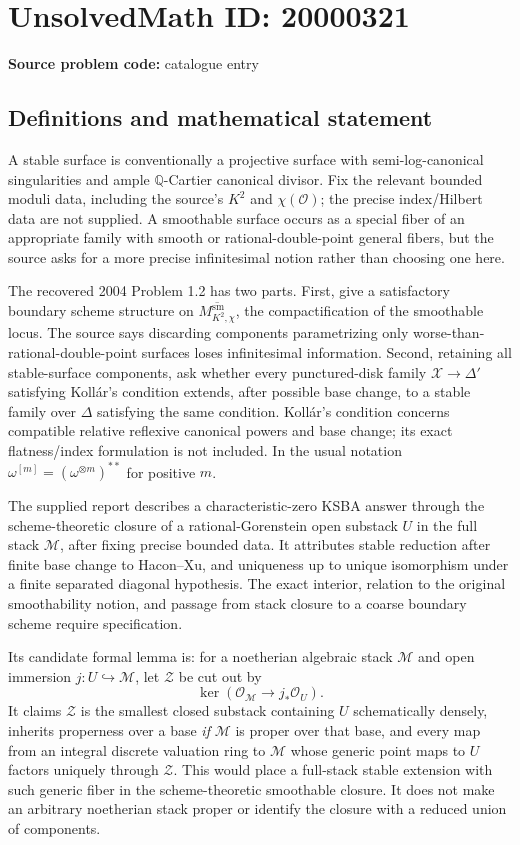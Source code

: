 \documentclass[11pt]{article}
\newcommand{\Q}{\mathbb{Q}}
\begin{document}
\section*{UnsolvedMath ID: 20000321}
\textbf{Source problem code:} catalogue entry
\subsection{Definitions and mathematical statement}
A stable surface is conventionally a projective surface with semi-log-canonical singularities and ample $\Q$-Cartier canonical divisor. Fix the relevant bounded moduli data, including the source's $K^2$ and $\chi(\mathcal O)$; the precise index/Hilbert data are not supplied. A smoothable surface occurs as a special fiber of an appropriate family with smooth or rational-double-point general fibers, but the source asks for a more precise infinitesimal notion rather than choosing one here.

The recovered 2004 Problem 1.2 has two parts. First, give a satisfactory boundary scheme structure on $\overline{M^{\mathrm{sm}}_{K^2,\chi}}$, the compactification of the smoothable locus. The source says discarding components parametrizing only worse-than-rational-double-point surfaces loses infinitesimal information. Second, retaining all stable-surface components, ask whether every punctured-disk family $\mathcal X\to\Delta'$ satisfying Koll\'ar's condition extends, after possible base change, to a stable family over $\Delta$ satisfying the same condition. Koll\'ar's condition concerns compatible relative reflexive canonical powers and base change; its exact flatness/index formulation is not included. In the usual notation $\omega^{[m]}=(\omega^{\otimes m})^{**}$ for positive $m$.

The supplied report describes a characteristic-zero KSBA answer through the scheme-theoretic closure of a rational-Gorenstein open substack $U$ in the full stack $\mathcal M$, after fixing precise bounded data. It attributes stable reduction after finite base change to Hacon--Xu, and uniqueness up to unique isomorphism under a finite separated diagonal hypothesis. The exact interior, relation to the original smoothability notion, and passage from stack closure to a coarse boundary scheme require specification.

Its candidate formal lemma is: for a noetherian algebraic stack $\mathcal M$ and open immersion $j:U\hookrightarrow\mathcal M$, let $\mathcal Z$ be cut out by
\[
 \ker(\mathcal O_{\mathcal M}\longrightarrow j_*\mathcal O_U).
\]
It claims $\mathcal Z$ is the smallest closed substack containing $U$ schematically densely, inherits properness over a base \emph{if} $\mathcal M$ is proper over that base, and every map from an integral discrete valuation ring to $\mathcal M$ whose generic point maps to $U$ factors uniquely through $\mathcal Z$. This would place a full-stack stable extension with such generic fiber in the scheme-theoretic smoothable closure. It does not make an arbitrary noetherian stack proper or identify the closure with a reduced union of components.
\end{document}
